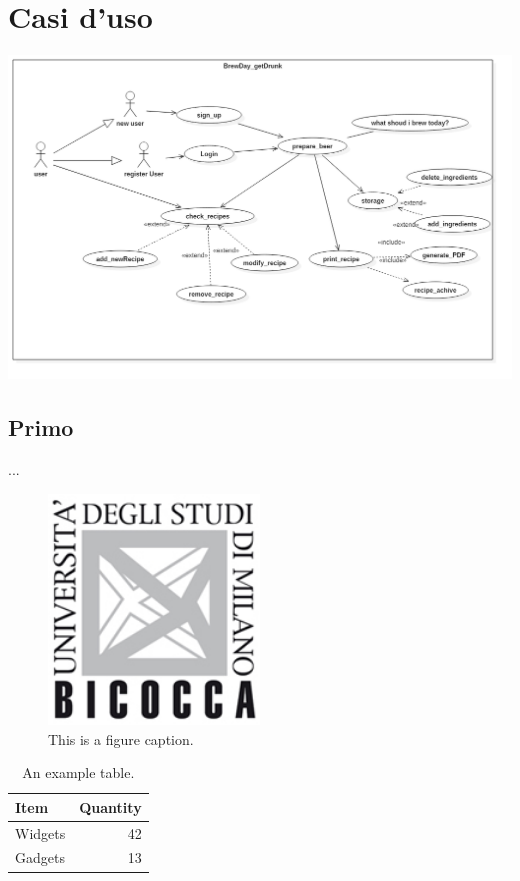 \documentclass[12pt]{article}
\begin{document}
\section{Casi d'uso}
\includegraphics{UseCaseDiagram.png}\\
\label{cd:primo}

\subsection{Primo}
...\\

\begin{figure}
\centering
\includegraphics[width=0.5\textwidth]{logo.jpg}
\caption{\label{fig:frog}This is a figure caption.}
\end{figure}

\begin{table}
\centering
\begin{tabular}{l|r}
Item & Quantity \\\hline
Widgets & 42 \\
Gadgets & 13
\end{tabular}
\caption{\label{tab:widgets}An example table.}
\end{table}
\end{document}
